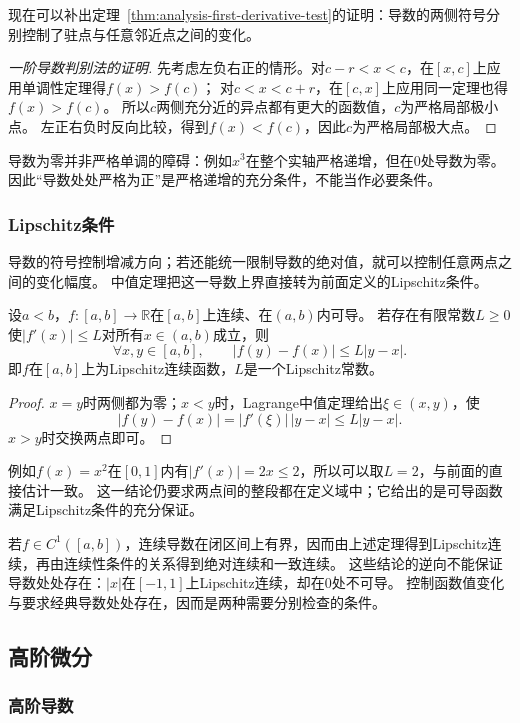 现在可以补出定理~\ref{thm:analysis-first-derivative-test}的证明：导数的两侧符号分别控制了驻点与任意邻近点之间的变化。
\begin{proof}[一阶导数判别法的证明]
先考虑左负右正的情形。对$c-r<x<c$，在$[x,c]$上应用单调性定理得$f(x)>f(c)$；
对$c<x<c+r$，在$[c,x]$上应用同一定理也得$f(x)>f(c)$。
所以$c$两侧充分近的异点都有更大的函数值，$c$为严格局部极小点。
左正右负时反向比较，得到$f(x)<f(c)$，因此$c$为严格局部极大点。
\end{proof}
导数为零并非严格单调的障碍：例如$x^3$在整个实轴严格递增，但在$0$处导数为零。
因此“导数处处严格为正”是严格递增的充分条件，不能当作必要条件。

\subsubsection{Lipschitz条件}

导数的符号控制增减方向；若还能统一限制导数的绝对值，就可以控制任意两点之间的变化幅度。
中值定理把这一导数上界直接转为前面定义的Lipschitz条件。
\begin{theorem}[有界导数与Lipschitz条件]
\label{thm:analysis-bounded-derivative-lipschitz}
设$a<b$，$f:[a,b]\to\mathbb R$在$[a,b]$上连续、在$(a,b)$内可导。
若存在有限常数$L\geq0$使$|f'(x)|\leq L$对所有$x\in(a,b)$成立，则
\[
 \forall x,y\in[a,b],\qquad |f(y)-f(x)|\leq L|y-x|.
\]
即$f$在$[a,b]$上为Lipschitz连续函数，$L$是一个Lipschitz常数。
\end{theorem}
\begin{proof}
$x=y$时两侧都为零；$x<y$时，Lagrange中值定理给出$\xi\in(x,y)$，使
\[
 |f(y)-f(x)|=|f'(\xi)|\,|y-x|\leq L|y-x|.
\]
$x>y$时交换两点即可。
\end{proof}
例如$f(x)=x^2$在$[0,1]$内有$|f'(x)|=2x\leq2$，所以可以取$L=2$，与前面的直接估计一致。
这一结论仍要求两点间的整段都在定义域中；它给出的是可导函数满足Lipschitz条件的充分保证。

若$f\in C^1([a,b])$，连续导数在闭区间上有界，因而由上述定理得到Lipschitz连续，再由连续性条件的关系得到绝对连续和一致连续。
这些结论的逆向不能保证导数处处存在：$|x|$在$[-1,1]$上Lipschitz连续，却在$0$处不可导。
控制函数值变化与要求经典导数处处存在，因而是两种需要分别检查的条件。

\subsection{高阶微分}

\subsubsection{高阶导数}

